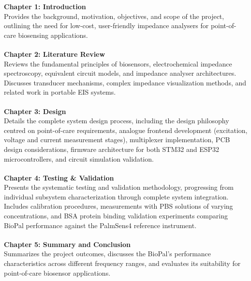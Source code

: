 \textbf{\large Chapter 1: Introduction} \\
Provides the background, motivation, objectives, and scope of the project, outlining the need for low-cost, user-friendly impedance analysers for point-of-care biosensing applications.
\\\\
\textbf{\large Chapter 2: Literature Review} \\
Reviews the fundamental principles of biosensors, electrochemical impedance spectroscopy, equivalent circuit models, and impedance analyser architectures. Discusses transducer mechanisms, complex impedance visualization methods, and related work in portable EIS systems.
\\\\
\textbf{\large Chapter 3: Design} \\
Details the complete system design process, including the design philosophy centred on point-of-care requirements, analogue frontend development (excitation, voltage and current measurement stages), multiplexer implementation, PCB design considerations, firmware architecture for both STM32 and ESP32 microcontrollers, and circuit simulation validation.
\\\\
\textbf{\large Chapter 4: Testing \& Validation} \\
Presents the systematic testing and validation methodology, progressing from individual subsystem characterization through complete system integration. Includes calibration procedures, measurements with PBS solutions of varying concentrations, and BSA protein binding validation experiments comparing BioPal performance against the PalmSens4 reference instrument.
\\\\
\textbf{\large Chapter 5: Summary and Conclusion} \\
Summarizes the project outcomes, discusses the BioPal's performance characteristics across different frequency ranges, and evaluates its suitability for point-of-care biosensor applications.

